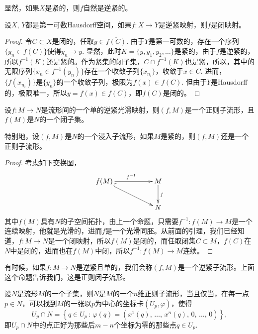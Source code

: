 显然，如果$X$是紧的，则$f$自然是逆紧的。

\begin{lem}
设$X$, $Y$都是第一可数Hausdorff空间，如果$f:X\to Y$是逆紧映射，则$f$是闭映射。
\end{lem}

\begin{proof}
	令$C\subset X$是闭的，任取$y\in \overline{f(C)}$. 由于$Y$是第一可数的，存在一个序列$\{y_n\in f(C)\}$使得$y_n\to y$. 显然，此时$K=\{y,y_1,y_2,\dots\}$是紧的，由于$f$是逆紧的，所以$f^{-1}(K)$还是紧的。作为紧集的闭子集，$C\cap f^{-1}(K)$也是紧，所以，其中的无限序列$\{x_n\in f^{-1}(y_n)\}$存在一个收敛子列$\{x_{n_i}\}$，收敛于$x\in C$. 进而，$\{f(x_{n_i})\}$是$\{y_n\}$的一个收敛子列，极限为$f(x)\in f(C)$. 但由于$Y$是Hausdorff的，极限唯一，所以$y=f(x)\in f(C)$，即$f(C)$是闭的。
\end{proof}

\begin{pro}\label{pro:1.2.16}
设$f:M\to N$是流形间的一个单的逆紧光滑映射，则$(f,M)$是一个正则子流形，且$f(M)$是$N$的一个闭子集。
\end{pro}

特别地，设$(f,M)$是$N$的一个浸入子流形，如果$M$是紧的，则$(f,M)$还是一个正则子流形。

\begin{proof}
	考虑如下交换图，
	\[
	\begin{xy}
		\xymatrix{
			f(M)\ar@{^{(}->}[rrd]\ar[rr]^{f^{-1}}&&M\ar[d]^f\\
			&&N
		}
	\end{xy}
	\]
	其中$f(M)$具有$N$的子空间拓扑，由上一个命题，只需要$f^{-1}:f(M)\to M$是一个连续映射，他就是光滑的，进而$f$是一个光滑同胚。从前面的引理，我们已经知道，$f:M\to N$是一个闭映射，所以$f(M)$是闭的，而任取闭集$C\subset M$，$f(C)$在$N$中是闭的，进而也在$f(M)$中闭，所以$f^{-1}:f(M)\to M$连续。
\end{proof}

有时候，如果$f:M\to N$是逆紧且单的，我们会称$(f,M)$是一个逆紧子流形。上面这个命题告诉我们，这是正则闭子流形。

\begin{thm}[正则子流形的结构定理]
设$N$是流形$M$的一个子集，则$N$是$M$的一个$n$维正则子流形，当且仅当，在每一点$p\in N$，可以找到$M$的一张以$p$为中心的坐标卡$(U_p,\varphi)$，使得
\[
	U_p\cap N=\left\{q\in U_p\,:\,\varphi(q)=\left(x^1(q)\text{, $\dots$, }x^n(q)\text{, }0\text{, $\dots$, }0\right)\right\},
\]
即$U_p\cap N$中的点正好为那些后$m-n$个坐标为零的那些点$q\in U_p$. 
\end{thm}


